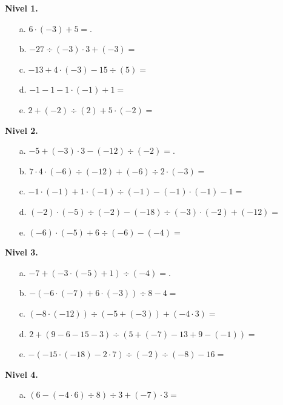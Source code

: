 \documentclass[spanish,letterpaper, 11pt, addpoints, answers]{exam}
\begin{document}
\begin{questions}
  \textbf{Nivel 1.}
  \begin{itemize}
  \item[a.] $6\cdot(-3)+5=$.
  
  \item[b.] $-27\div (-3)\cdot 3+(-3)=$
  
  \item[c.] $-13+4\cdot (-3)-15\div (5)=$
  
  \item[d.] $-1-1-1\cdot(-1)+1=$
  
  \item[e.] $2+(-2)\div (2)+5\cdot (-2)=$
  \end{itemize}
  
  \textbf{Nivel 2.}
  \begin{itemize}
  \item[a.] $-5+(-3)\cdot 3-(-12)\div (-2)=$.
  
  \item[b.] $7\cdot 4\cdot (-6)\div (-12)+(-6)\div 2\cdot (-3)=$
  
  \item[c.] $-1\cdot (-1)+1\cdot (-1)\div (-1)-(-1)\cdot (-1)-1=$
  
  \item[d.] $(-2)\cdot (-5)\div (-2)-(-18)\div(-3)\cdot (-2)+(-12)=$
  
  \item[e.] $(-6)\cdot(-5)+6\div(-6)-(-4)=$
  
  \end{itemize}
  
  \textbf{Nivel 3.}
  \begin{itemize}
  \item[a.] $-7+(-3\cdot (-5)+1)\div(-4)=$.
  
  \item[b.] $-(-6\cdot (-7)+6\cdot(-3))\div 8-4=$
  
  \item[c.] $(-8\cdot (-12))\div (-5+(-3))+(-4\cdot 3)=$
  
  \item[d.] $2+(9-6-15-3)\div (5+(-7)-13+9-(-1))=$ 
  
  \item[e.] $-(-15\cdot (-18)-2\cdot 7)\div (-2)\div (-8)-16=$ 
  
  \end{itemize}
  
  \textbf{Nivel 4.}
  \begin{itemize}
  \item[a.] $(6-(-4\cdot 6)\div 8)\div 3+(-7)\cdot 3=$
  

\end{itemize}
\end{questions}
\end{document}
